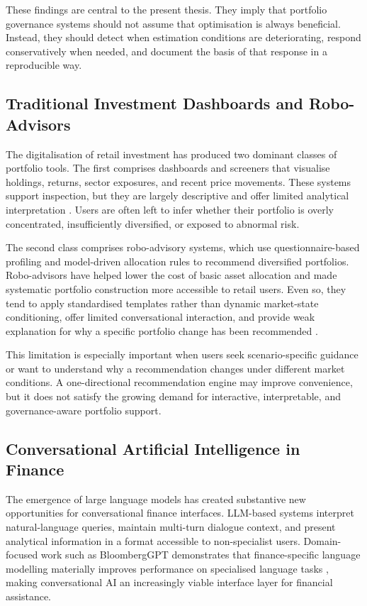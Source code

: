 \documentclass[11pt]{article}
\begin{document}
These findings are central to the present thesis. They imply that portfolio governance systems should not assume that optimisation is always beneficial. Instead, they should detect when estimation conditions are deteriorating, respond conservatively when needed, and document the basis of that response in a reproducible way.

\subsection{Traditional Investment Dashboards and Robo-Advisors}
The digitalisation of retail investment has produced two dominant classes of portfolio tools. The first comprises dashboards and screeners that visualise holdings, returns, sector exposures, and recent price movements. These systems support inspection, but they are largely descriptive and offer limited analytical interpretation \cite{bahrammirzaee2010,kolm2014}. Users are often left to infer whether their portfolio is overly concentrated, insufficiently diversified, or exposed to abnormal risk.

The second class comprises robo-advisory systems, which use questionnaire-based profiling and model-driven allocation rules to recommend diversified portfolios. Robo-advisors have helped lower the cost of basic asset allocation and made systematic portfolio construction more accessible to retail users. Even so, they tend to apply standardised templates rather than dynamic market-state conditioning, offer limited conversational interaction, and provide weak explanation for why a specific portfolio change has been recommended \cite{kolm2014,demiguel2009}.

This limitation is especially important when users seek scenario-specific guidance or want to understand why a recommendation changes under different market conditions. A one-directional recommendation engine may improve convenience, but it does not satisfy the growing demand for interactive, interpretable, and governance-aware portfolio support.

\subsection{Conversational Artificial Intelligence in Finance}
The emergence of large language models has created substantive new opportunities for conversational finance interfaces. LLM-based systems interpret natural-language queries, maintain multi-turn dialogue context, and present analytical information in a format accessible to non-specialist users. Domain-focused work such as BloombergGPT demonstrates that finance-specific language modelling materially improves performance on specialised language tasks \cite{wu2023}, making conversational AI an increasingly viable interface layer for financial assistance.
\end{document}
